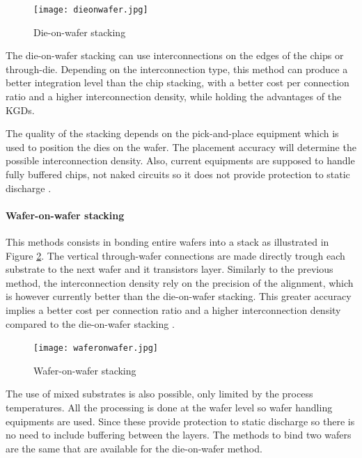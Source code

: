 \begin{figure}
\begin{center}
\texttt{[image: dieonwafer.jpg]}
\end{center}
\caption{Die-on-wafer stacking \cite{tezzaron14}}
\label{fig:dieonwafer}
\end{figure}

The die-on-wafer stacking can use interconnections on the edges of the chips or through-die. Depending on the interconnection type, this method can produce a better integration level than the chip stacking, with a better cost per connection ratio and a higher interconnection density, while holding the advantages of the KGDs.

The quality of the stacking depends on the pick-and-place equipment which is used to position the dies on the wafer. The placement accuracy will determine the possible interconnection density. Also, current equipments are supposed to handle fully buffered chips, not naked circuits so it does not provide protection to static discharge \cite{659500}. 

\paragraph{Wafer-on-wafer stacking}

This methods consists in bonding entire wafers into a stack as illustrated in Figure \ref{fig:waferonwafer}. The vertical through-wafer connections are made directly trough each substrate to the next wafer and it transistors layer. Similarly to the previous method, the interconnection density rely on the precision of the alignment, which is however currently better than the die-on-wafer stacking. This greater accuracy implies a better cost per connection ratio and a higher interconnection density compared to the die-on-wafer stacking \cite{659500}.

\begin{figure}
\begin{center}
\texttt{[image: waferonwafer.jpg]}
\end{center}
\caption{Wafer-on-wafer stacking \cite{tezzaron14}}
\label{fig:waferonwafer}
\end{figure}

The use of mixed substrates is also possible, only limited by the process temperatures. All the processing is done at the wafer level so wafer handling equipments are used. Since these provide protection to static discharge so there is no need to include buffering between the layers. The methods to bind two wafers are the same that are available for the die-on-wafer method.


